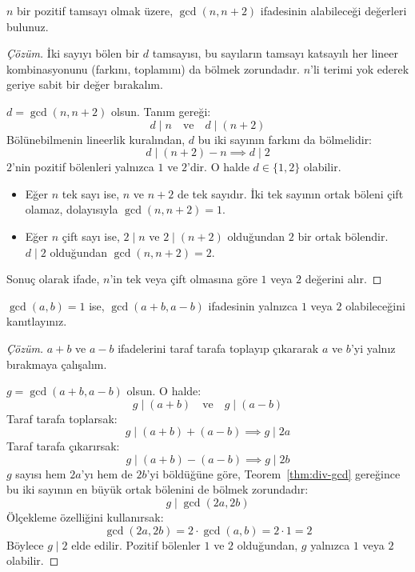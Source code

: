 \begin{example}
$n$ bir pozitif tamsayı olmak üzere, $\gcd(n, n+2)$ ifadesinin alabileceği değerleri bulunuz.
\end{example}

\begin{proof}[Çözüm]
İki sayıyı bölen bir $d$ tamsayısı, bu sayıların tamsayı katsayılı her lineer kombinasyonunu (farkını, toplamını) da bölmek zorundadır. $n$'li terimi yok ederek geriye sabit bir değer bırakalım.

$d = \gcd(n, n+2)$ olsun. Tanım gereği:
\[ d \mid n \quad \text{ve} \quad d \mid (n+2) \]
Bölünebilmenin lineerlik kuralından, $d$ bu iki sayının farkını da bölmelidir:
\[ d \mid (n+2) - n \implies d \mid 2 \]
$2$'nin pozitif bölenleri yalnızca $1$ ve $2$'dir. O halde $d \in \{1, 2\}$ olabilir.
\begin{itemize}
    \item Eğer $n$ tek sayı ise, $n$ ve $n+2$ de tek sayıdır. İki tek sayının ortak böleni çift olamaz, dolayısıyla $\gcd(n, n+2) = 1$.
    \item Eğer $n$ çift sayı ise, $2 \mid n$ ve $2 \mid (n+2)$ olduğundan $2$ bir ortak bölendir. $d \mid 2$ olduğundan $\gcd(n, n+2) = 2$.
\end{itemize}
Sonuç olarak ifade, $n$'in tek veya çift olmasına göre $1$ veya $2$ değerini alır.
\end{proof}

\begin{example}
$\gcd(a, b) = 1$ ise, $\gcd(a+b, a-b)$ ifadesinin yalnızca $1$ veya $2$ olabileceğini kanıtlayınız.
\end{example}

\begin{proof}[Çözüm]
$a+b$ ve $a-b$ ifadelerini taraf tarafa toplayıp çıkararak $a$ ve $b$'yi yalnız bırakmaya çalışalım.

$g = \gcd(a+b, a-b)$ olsun. O halde:
\[ g \mid (a+b) \quad \text{ve} \quad g \mid (a-b) \]
Taraf tarafa toplarsak:
\[ g \mid (a+b) + (a-b) \implies g \mid 2a \]
Taraf tarafa çıkarırsak:
\[ g \mid (a+b) - (a-b) \implies g \mid 2b \]
$g$ sayısı hem $2a$'yı hem de $2b$'yi böldüğüne göre, Teorem~\ref{thm:div-gcd} gereğince bu iki sayının en büyük ortak bölenini de bölmek zorundadır:
\[ g \mid \gcd(2a, 2b) \]
Ölçekleme özelliğini kullanırsak:
\[ \gcd(2a, 2b) = 2 \cdot \gcd(a, b) = 2 \cdot 1 = 2 \]
Böylece $g \mid 2$ elde edilir. Pozitif bölenler $1$ ve $2$ olduğundan, $g$ yalnızca $1$ veya $2$ olabilir.
\end{proof}

